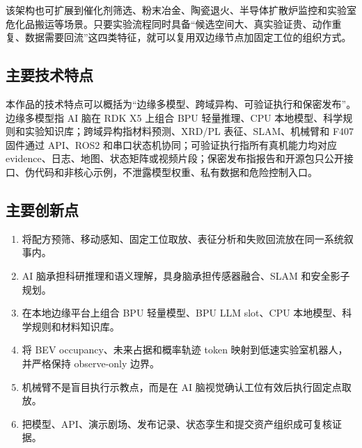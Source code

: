 该架构也可扩展到催化剂筛选、粉末冶金、陶瓷退火、半导体扩散炉监控和实验室危化品搬运等场景。只要实验流程同时具备“候选空间大、真实验证贵、动作重复、数据需要回流”这四类特征，就可以复用双边缘节点加固定工位的组织方式。

\subsection{主要技术特点}
本作品的技术特点可以概括为“边缘多模型、跨域异构、可验证执行和保密发布”。边缘多模型指 AI 脑在 RDK X5 上组合 BPU 轻量推理、CPU 本地模型、科学规则和实验知识库；跨域异构指材料预测、XRD/PL 表征、SLAM、机械臂和 F407 固件通过 API、ROS2 和串口状态机协同；可验证执行指所有真机能力均对应 evidence、日志、地图、状态矩阵或视频片段；保密发布指报告和开源包只公开接口、伪代码和非核心示例，不泄露模型权重、私有数据和危险控制入口。

\subsection{主要创新点}
\begin{enumerate}
  \item {} 将配方预筛、移动感知、固定工位取放、表征分析和失败回流放在同一系统叙事内。
  \item {} AI 脑承担科研推理和语义理解，具身脑承担传感器融合、SLAM 和安全影子规划。
  \item {} 在本地边缘平台上组合 BPU 轻量模型、BPU LLM slot、CPU 本地模型、科学规则和材料知识库。
  \item {} 将 BEV occupancy、未来占据和概率轨迹 token 映射到低速实验室机器人，并严格保持 observe-only 边界。
  \item {} 机械臂不是盲目执行示教点，而是在 AI 脑视觉确认工位有效后执行固定点取放。
  \item {} 把模型、API、演示剧场、发布记录、状态孪生和提交资产组织成可复核证据。
\end{enumerate}

